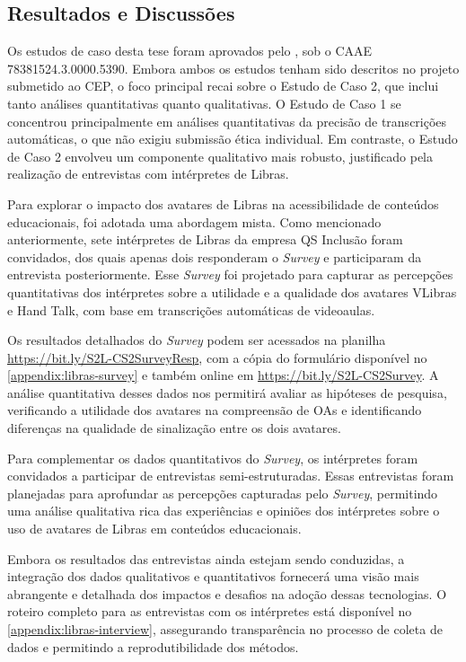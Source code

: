 \subsection{Resultados e Discussões}

Os estudos de caso desta tese foram aprovados pelo , sob o CAAE 78381524.3.0000.5390. Embora ambos os estudos tenham sido descritos no projeto submetido ao CEP, o foco principal recai sobre o Estudo de Caso 2, que inclui tanto análises quantitativas quanto qualitativas. O Estudo de Caso 1 se concentrou principalmente em análises quantitativas da precisão de transcrições automáticas, o que não exigiu submissão ética individual. Em contraste, o Estudo de Caso 2 envolveu um componente qualitativo mais robusto, justificado pela realização de entrevistas com intérpretes de Libras.

Para explorar o impacto dos avatares de Libras na acessibilidade de conteúdos educacionais, foi adotada uma abordagem mista. Como mencionado anteriormente, sete intérpretes de Libras da empresa QS Inclusão foram convidados, dos quais apenas dois responderam o \textit{Survey} e participaram da entrevista posteriormente. Esse \textit{Survey} foi projetado para capturar as percepções quantitativas dos intérpretes sobre a utilidade e a qualidade dos avatares VLibras e Hand Talk, com base em transcrições automáticas de videoaulas.

Os resultados detalhados do \textit{Survey} podem ser acessados na planilha \url{https://bit.ly/S2L-CS2SurveyResp}, com a cópia do formulário disponível no \autoref{appendix:libras-survey} e também online em \url{https://bit.ly/S2L-CS2Survey}. A análise quantitativa desses dados nos permitirá avaliar as hipóteses de pesquisa, verificando a utilidade dos avatares na compreensão de OAs e identificando diferenças na qualidade de sinalização entre os dois avatares.

Para complementar os dados quantitativos do \textit{Survey}, os intérpretes foram convidados a participar de entrevistas semi-estruturadas. Essas entrevistas foram planejadas para aprofundar as percepções capturadas pelo \textit{Survey}, permitindo uma análise qualitativa rica das experiências e opiniões dos intérpretes sobre o uso de avatares de Libras em conteúdos educacionais.

Embora os resultados das entrevistas ainda estejam sendo conduzidas, a integração dos dados qualitativos e quantitativos fornecerá uma visão mais abrangente e detalhada dos impactos e desafios na adoção dessas tecnologias. O roteiro completo para as entrevistas com os intérpretes está disponível no \autoref{appendix:libras-interview}, assegurando transparência no processo de coleta de dados e permitindo a reprodutibilidade dos métodos.


